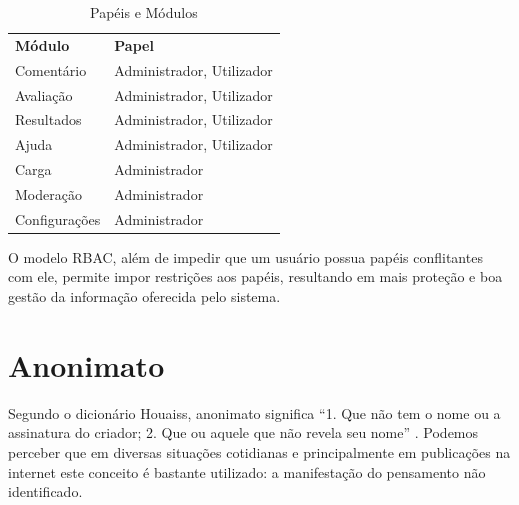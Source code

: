 \documentclass[12pt, a4paper]{report}
\begin{document}
\begin{table}
 \centering
 {\renewcommand\arraystretch{1.25}
 
 \begin{tabular}{ l l }
  \cline{1-1}\cline{2-2}  
    \multicolumn{1}{|p{3.850cm}|}{\textbf{Módulo} \centering } &
    \multicolumn{1}{p{7.217cm}|}{\textbf{Papel} \centering }
  \\  
  \cline{1-1}\cline{2-2}  
    \multicolumn{1}{|p{3.850cm}|}{Comentário} &
    \multicolumn{1}{p{6.217cm}|}{Administrador, Utilizador}
  \\  
  \cline{1-1}\cline{2-2}  
    \multicolumn{1}{|p{3.850cm}|}{Avaliação} &
    \multicolumn{1}{p{6.217cm}|}{Administrador, Utilizador}
  \\  
    \cline{1-1}\cline{2-2}  
    \multicolumn{1}{|p{3.850cm}|}{Resultados} &
    \multicolumn{1}{p{6.217cm}|}{Administrador, Utilizador}
  \\  
    \cline{1-1}\cline{2-2}  
    \multicolumn{1}{|p{3.850cm}|}{Ajuda} &
    \multicolumn{1}{p{6.217cm}|}{Administrador, Utilizador}
  \\  
    \cline{1-1}\cline{2-2}  
    \multicolumn{1}{|p{3.850cm}|}{Carga} &
    \multicolumn{1}{p{6.217cm}|}{Administrador}
  \\  
    \cline{1-1}\cline{2-2}  
    \multicolumn{1}{|p{3.850cm}|}{Moderação} &
    \multicolumn{1}{p{6.217cm}|}{Administrador}
  \\  
    \cline{1-1}\cline{2-2}  
    \multicolumn{1}{|p{3.850cm}|}{Configurações} &
    \multicolumn{1}{p{6.217cm}|}{Administrador}
  \\  
  \hline
 \end{tabular} }
 \caption{Papéis e Módulos}
 \label{tab:papelmod}
\end{table}

O modelo \ac{RBAC}, além de impedir que um usuário possua papéis conflitantes com ele, permite impor restrições aos papéis, resultando em mais proteção e boa gestão da informação oferecida pelo sistema.

\section{ Anonimato}

Segundo o dicionário Houaiss, anonimato significa ``1. Que não tem o nome ou a assinatura do criador; 2. Que ou aquele que não revela seu nome'' \cite[p. 7]{houasis2001}. Podemos perceber que em diversas situações cotidianas e principalmente em publicações na internet este conceito é bastante utilizado: a manifestação do pensamento não identificado.
\end{document}
